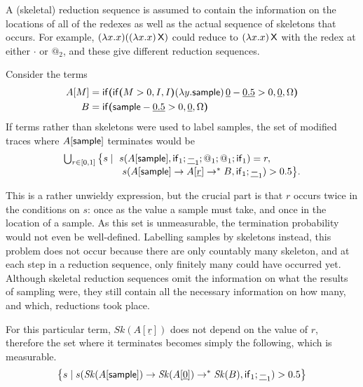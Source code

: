 A (skeletal) reduction sequence is assumed to contain the information on the locations of all of the redexes as well as the actual sequence of skeletons that occurs. For example, $(\lambda x. x) ((\lambda x. x) \, \mathsf{X})$ could reduce to $(\lambda x. x) \, \mathsf{X}$ with the redex at either $\cdot$ or $@_2$, and these give different reduction sequences.

\begin{example}%
Consider the terms
\begin{align*}
A[M] &= \mathsf{if}\boldsymbol{(}\mathsf{if}\boldsymbol{(}M>0, I, I\boldsymbol{)} (\lambda y.\mathsf{sample})\, \underline 0 - \underline{0.5} > 0, \underline 0, \Omega\boldsymbol{)}\\
B &= \mathsf{if}\boldsymbol{(}\mathsf{sample} - \underline{0.5} > 0, \underline 0, \Omega\boldsymbol{)}
\end{align*}
If terms rather than skeletons were used to label samples, the set of modified traces where $A[\mathsf{sample}]$ terminates would be
\[
\begin{array}{l}
\bigcup_{r \in [0,1]} \big\{s \mid\ s(A[\mathsf{sample}], \mathsf{if}_1;\underline{-}_1;@_1;@_1;\mathsf{if}_1) = r, \\
\qquad\qquad\qquad s(A[\mathsf{sample}] \to A[\underline r] \to^* B, \mathsf{if}_1 ; \underline{-}_1) > 0.5 \big\}.
\end{array}
\]
\iffalse
\lo{The occurrence of $L_s(M)$ in the set comprehension below should be $L_0(M)$?}

\lo{I think we should write ``$[A[\tsample], A[\underline r], \ldots, B$'' in the line above as ``$A[\tsample] \to A[\underline r] \to^\ast B$''; similarly $\mathit{Sk}(A[\tsample]) \to \mathit{Sk}(A[\underline 0]) \to^\ast \mathit{Sk}(B)$ below.}
\fi
This is a rather unwieldy expression, but the crucial part is that $r$ occurs twice in the conditions on $s$: once as the value a sample must take, and once in the location of a sample. 
As this set is unmeasurable, the termination probability would not even be well-defined. 
Labelling samples by skeletons instead, this problem does not occur because there are only countably many skeleton, and at each step in a reduction sequence, only finitely many could have occurred yet. Although skeletal reduction sequences omit the information on what the results of sampling were, they still contain all the necessary information on how many, and which, reductions took place.

For this particular term, $\mathit{Sk}(A[\underline r])$ does not depend on the value of $r$, therefore the set where it terminates becomes simply the following, which is measurable.
\begin{align*}
\big\{s \mid s(\mathit{Sk}(A[\mathsf{sample}]) \to \mathit{Sk}(A[\underline 0]) \to^* \mathit{Sk}(B), \mathsf{if}_1 ; \underline{-}_1) > 0.5 \big\}
\end{align*}
\end{example}

